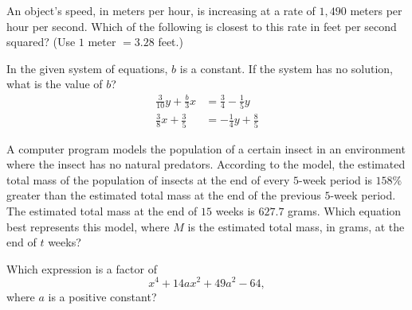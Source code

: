 \newpage

\noindent\markforreview
\vspace{1em}

An object's speed, in meters per hour, is increasing at a rate of \(1{,}490\)
meters per hour per second. Which of the following is closest to this rate in
feet per second squared? (Use \(1\) meter \(=3.28\) feet.)

\vspace{2em}

\noindent\markforreview
\vspace{1em}

In the given system of equations, \(b\) is a constant. If the system has no
solution, what is the value of \(b\)?
\[
\begin{aligned}
\frac3{10}y+\frac b3x&=\frac34-\frac15y\\
\frac38x+\frac35&=-\frac14y+\frac85
\end{aligned}
\]


\newpage

\noindent\markforreview
\vspace{1em}

A computer program models the population of a certain insect in an environment
where the insect has no natural predators. According to the model, the estimated
total mass of the population of insects at the end of every \(5\)-week period is
\(158\%\) greater than the estimated total mass at the end of the previous
\(5\)-week period. The estimated total mass at the end of \(15\) weeks is
\(627.7\) grams. Which equation best represents this model, where \(M\) is the
estimated total mass, in grams, at the end of \(t\) weeks?

\vspace{2em}

\noindent\markforreview
\vspace{1em}

Which expression is a factor of
\[
x^4+14ax^2+49a^2-64,
\]
where \(a\) is a positive constant?

\newpage

\noindent\markforreview
\vspace{1em}

